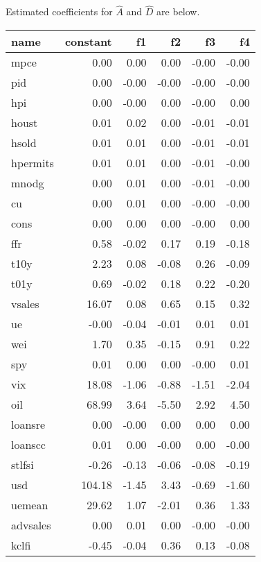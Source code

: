 \documentclass[11pt, letterpaper]{article}\usepackage[]{graphicx}\usepackage[]{color}
\begin{document}
Estimated coefficients for $\widehat{A}$ and $\widehat{D}$ are below.
\begin{table}[H]
\centering
\begingroup\footnotesize
\begin{tabular}{lrrrrr}
  \hline
name & constant & f1 & f2 & f3 & f4 \\ 
  \hline
mpce & 0.00 & 0.00 & 0.00 & -0.00 & -0.00 \\ 
  pid & 0.00 & -0.00 & -0.00 & -0.00 & -0.00 \\ 
  hpi & 0.00 & -0.00 & 0.00 & -0.00 & 0.00 \\ 
  houst & 0.01 & 0.02 & 0.00 & -0.01 & -0.01 \\ 
  hsold & 0.01 & 0.01 & 0.00 & -0.01 & -0.01 \\ 
  hpermits & 0.01 & 0.01 & 0.00 & -0.01 & -0.00 \\ 
  mnodg & 0.00 & 0.01 & 0.00 & -0.01 & -0.00 \\ 
  cu & 0.00 & 0.01 & 0.00 & -0.00 & -0.00 \\ 
  cons & 0.00 & 0.00 & 0.00 & -0.00 & 0.00 \\ 
  ffr & 0.58 & -0.02 & 0.17 & 0.19 & -0.18 \\ 
  t10y & 2.23 & 0.08 & -0.08 & 0.26 & -0.09 \\ 
  t01y & 0.69 & -0.02 & 0.18 & 0.22 & -0.20 \\ 
  vsales & 16.07 & 0.08 & 0.65 & 0.15 & 0.32 \\ 
  ue & -0.00 & -0.04 & -0.01 & 0.01 & 0.01 \\ 
  wei & 1.70 & 0.35 & -0.15 & 0.91 & 0.22 \\ 
  spy & 0.01 & 0.00 & 0.00 & -0.00 & 0.01 \\ 
  vix & 18.08 & -1.06 & -0.88 & -1.51 & -2.04 \\ 
  oil & 68.99 & 3.64 & -5.50 & 2.92 & 4.50 \\ 
  loansre & 0.00 & -0.00 & 0.00 & 0.00 & 0.00 \\ 
  loanscc & 0.01 & 0.00 & -0.00 & 0.00 & -0.00 \\ 
  stlfsi & -0.26 & -0.13 & -0.06 & -0.08 & -0.19 \\ 
  usd & 104.18 & -1.45 & 3.43 & -0.69 & -1.60 \\ 
  uemean & 29.62 & 1.07 & -2.01 & 0.36 & 1.33 \\ 
  advsales & 0.00 & 0.01 & 0.00 & -0.00 & -0.00 \\ 
  kclfi & -0.45 & -0.04 & 0.36 & 0.13 & -0.08 \\ 

\end{tabular}
\end{table}
\end{document}
